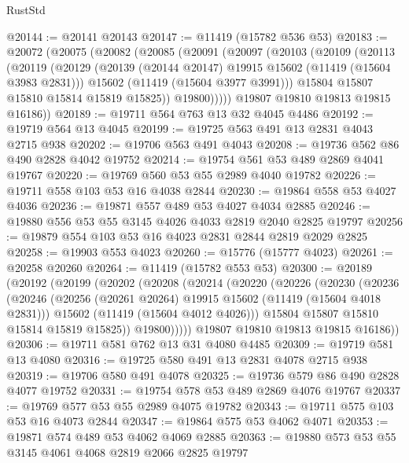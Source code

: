\begin{lexlean}{RustStd}
\begin{coremodule}
@20144 := @20141 @20143
@20147 := @11419 (@15782 @536 @53)
@20183 := @20072
    (@20075
      (@20082
        (@20085
          (@20091
            (@20097
              (@20103
                (@20109
                  (@20113
                    (@20119
                      (@20129
                        (@20139 (@20144 @20147) @19915 @15602 (@11419 (@15604 @3983 @2831)))
                        @15602
                        (@11419 (@15604 @3977 @3991)))
                      @15804
                      @15807
                      @15810
                      @15814
                      @15819
                      @15825))
                  @19800)))))
        @19807
        @19810
        @19813
        @19815
        @16186))
@20189 := @19711 @564 @763 @13 @32 @4045 @4486
@20192 := @19719 @564 @13 @4045
@20199 := @19725 @563 @491 @13 @2831 @4043 @2715 @938
@20202 := @19706 @563 @491 @4043
@20208 := @19736 @562 @86 @490 @2828 @4042 @19752
@20214 := @19754 @561 @53 @489 @2869 @4041 @19767
@20220 := @19769 @560 @53 @55 @2989 @4040 @19782
@20226 := @19711 @558 @103 @53 @16 @4038 @2844
@20230 := @19864 @558 @53 @4027 @4036
@20236 := @19871 @557 @489 @53 @4027 @4034 @2885
@20246 := @19880 @556 @53 @55 @3145 @4026 @4033 @2819 @2040 @2825 @19797
@20256 := @19879 @554 @103 @53 @16 @4023 @2831 @2844 @2819 @2029 @2825
@20258 := @19903 @553 @4023
@20260 := @15776 (@15777 @4023)
@20261 := @20258 @20260
@20264 := @11419 (@15782 @553 @53)
@20300 := @20189
    (@20192
      (@20199
        (@20202
          (@20208
            (@20214
              (@20220
                (@20226
                  (@20230
                    (@20236
                      (@20246
                        (@20256 (@20261 @20264) @19915 @15602 (@11419 (@15604 @4018 @2831)))
                        @15602
                        (@11419 (@15604 @4012 @4026)))
                      @15804
                      @15807
                      @15810
                      @15814
                      @15819
                      @15825))
                  @19800)))))
        @19807
        @19810
        @19813
        @19815
        @16186))
@20306 := @19711 @581 @762 @13 @31 @4080 @4485
@20309 := @19719 @581 @13 @4080
@20316 := @19725 @580 @491 @13 @2831 @4078 @2715 @938
@20319 := @19706 @580 @491 @4078
@20325 := @19736 @579 @86 @490 @2828 @4077 @19752
@20331 := @19754 @578 @53 @489 @2869 @4076 @19767
@20337 := @19769 @577 @53 @55 @2989 @4075 @19782
@20343 := @19711 @575 @103 @53 @16 @4073 @2844
@20347 := @19864 @575 @53 @4062 @4071
@20353 := @19871 @574 @489 @53 @4062 @4069 @2885
@20363 := @19880 @573 @53 @55 @3145 @4061 @4068 @2819 @2066 @2825 @19797

\end{coremodule}
\end{lexlean}

